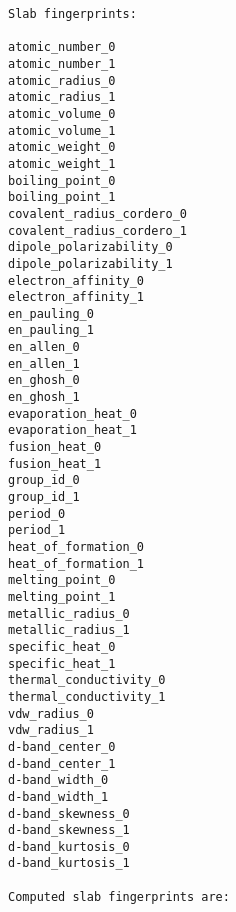 \documentclass[11pt]{article}
\begin{document}
\begin{verbatim}
Slab fingerprints:

atomic_number_0
atomic_number_1
atomic_radius_0
atomic_radius_1
atomic_volume_0
atomic_volume_1
atomic_weight_0
atomic_weight_1
boiling_point_0
boiling_point_1
covalent_radius_cordero_0
covalent_radius_cordero_1
dipole_polarizability_0
dipole_polarizability_1
electron_affinity_0
electron_affinity_1
en_pauling_0
en_pauling_1
en_allen_0
en_allen_1
en_ghosh_0
en_ghosh_1
evaporation_heat_0
evaporation_heat_1
fusion_heat_0
fusion_heat_1
group_id_0
group_id_1
period_0
period_1
heat_of_formation_0
heat_of_formation_1
melting_point_0
melting_point_1
metallic_radius_0
metallic_radius_1
specific_heat_0
specific_heat_1
thermal_conductivity_0
thermal_conductivity_1
vdw_radius_0
vdw_radius_1
d-band_center_0
d-band_center_1
d-band_width_0
d-band_width_1
d-band_skewness_0
d-band_skewness_1
d-band_kurtosis_0
d-band_kurtosis_1

Computed slab fingerprints are:


\end{verbatim}
\end{document}
